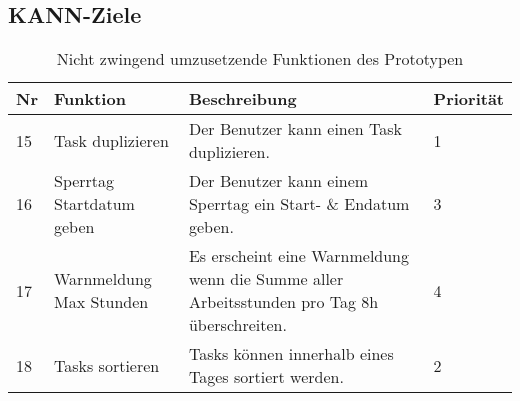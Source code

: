 \subsection{KANN-Ziele}
\begin{table}[!ht]
\begin{center}
    \begin{tabular}{llp{8cm}l}
        \toprule Nr & Funktion & Beschreibung & Priorität \\
        \midrule 15 & Task duplizieren & Der Benutzer kann einen Task duplizieren. & 1\\
        \midrule 16 & Sperrtag Startdatum geben & Der Benutzer kann einem Sperrtag ein Start- \& Endatum geben. &  3\\ 
        \midrule 17 & Warnmeldung Max Stunden & Es erscheint eine Warnmeldung wenn die Summe aller Arbeitsstunden pro Tag 8h überschreiten. & 4\\
        \midrule 18 & Tasks sortieren & Tasks können innerhalb eines Tages sortiert werden. & 2\\
        \bottomrule
    \end{tabular}
    \caption{Nicht zwingend umzusetzende Funktionen des Prototypen}
    \label{tab:kann_funktionen}
\end{center}
\end{table}


% 
